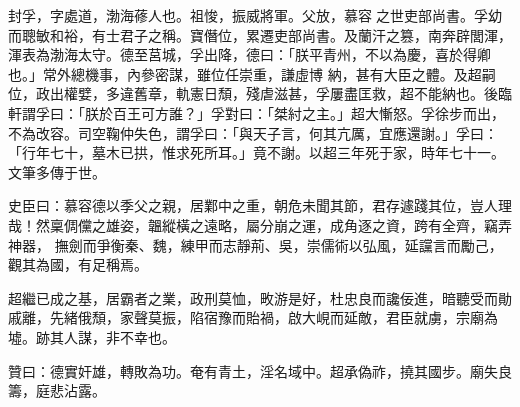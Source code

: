 \begin{pinyinscope}
 封孚，字處道，渤海蓚人也。祖悛，振威將軍。父放，慕容之世吏部尚書。孚幼而聰敏和裕，有士君子之稱。寶僭位，累遷吏部尚書。及蘭汗之篡，南奔辟閭渾，渾表為渤海太守。德至莒城，孚出降，德曰：「朕平青州，不以為慶，喜於得卿也。」常外總機事，內參密謀，雖位任崇重，謙虛博
 納，甚有大臣之體。及超嗣位，政出權嬖，多違舊章，軌憲日頹，殘虐滋甚，孚屢盡匡救，超不能納也。後臨軒謂孚曰：「朕於百王可方誰？」孚對曰：「桀紂之主。」超大慚怒。孚徐步而出，不為改容。司空鞠仲失色，謂孚曰：「與天子言，何其亢厲，宜應還謝。」孚曰：「行年七十，墓木已拱，惟求死所耳。」竟不謝。以超三年死于家，時年七十一。文筆多傳于世。



 史臣曰：慕容德以季父之親，居鄴中之重，朝危未聞其節，君存遽踐其位，豈人理哉！然稟倜儻之雄姿，韞縱橫之遠略，屬分崩之運，成角逐之資，跨有全齊，竊弄神器，
 撫劍而爭衡秦、魏，練甲而志靜荊、吳，崇儒術以弘風，延讜言而勵己，觀其為國，有足稱焉。



 超繼已成之基，居霸者之業，政刑莫恤，畋游是好，杜忠良而讒佞進，暗聽受而勛戚離，先緒俄頹，家聲莫振，陷宿豫而貽禍，啟大峴而延敵，君臣就虜，宗廟為墟。跡其人謀，非不幸也。



 贊曰：德實奸雄，轉敗為功。奄有青土，淫名域中。超承偽祚，撓其國步。廟失良籌，庭悲沾露。



\end{pinyinscope}